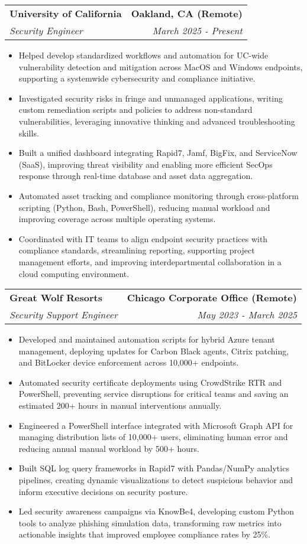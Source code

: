\documentclass[letterpaper,10pt]{article}
\makeatletter
\newcommand{\resumeItem}[1]{\item\small{#1}}
\newcommand{\resumeItemListStart}{\begin{itemize}}
\newcommand{\resumeItemListEnd}{\end{itemize}\vspace{-2pt}}
\newcommand{\resumeSubheading}[4]{%
  \vspace{-2pt}\item
  \begin{tabular*}{\textwidth}[t]{l@{\extracolsep{\fill}}r}
    \textbf{\large #1} & \textbf{\small #2} \\
    \textit{\large #3} & \textit{\small #4} \\
  \end{tabular*}\vspace{-2pt}
}
\makeatother
\begin{document}
\resumeSubheading
  {University of California}{Oakland, CA (Remote)}
  {Security Engineer}{March 2025 - Present}
  \vspace{2pt}
\resumeItemListStart
  \resumeItem{Helped develop standardized workflows and automation for UC-wide vulnerability detection and mitigation across MacOS and Windows endpoints, supporting a systemwide cybersecurity and compliance initiative.}
  \resumeItem{Investigated security risks in fringe and unmanaged applications, writing custom remediation scripts and policies to address non-standard vulnerabilities, leveraging innovative thinking and advanced troubleshooting skills.}
  \resumeItem{Built a unified dashboard integrating Rapid7, Jamf, BigFix, and ServiceNow (SaaS), improving threat visibility and enabling more efficient SecOps response through real-time database and asset data aggregation.}
  \resumeItem{Automated asset tracking and compliance monitoring through cross-platform scripting (Python, Bash, PowerShell), reducing manual workload and improving coverage across multiple operating systems.}
  \resumeItem{Coordinated with IT teams to align endpoint security practices with compliance standards, streamlining reporting, supporting project management efforts, and improving interdepartmental collaboration in a cloud computing environment.}
\resumeItemListEnd
\vspace{6pt}

\resumeSubheading
  {Great Wolf Resorts}{Chicago Corporate Office (Remote)}
  {Security Support Engineer}{May 2023 - March 2025}
\vspace{2pt}
\resumeItemListStart
  \resumeItem{Developed and maintained automation scripts for hybrid Azure tenant management, deploying updates for Carbon Black agents, Citrix patching, and BitLocker device enforcement across 10,000+ endpoints.}
  \resumeItem{Automated security certificate deployments using CrowdStrike RTR and PowerShell, preventing service disruptions for critical teams and saving an estimated 200+ hours in manual interventions annually.}
  \resumeItem{Engineered a PowerShell interface integrated with Microsoft Graph API for managing distribution lists of 10,000+ users, eliminating human error and reducing annual manual workload by 500+ hours.}
  \resumeItem{Built SQL log query frameworks in Rapid7 with Pandas/NumPy analytics pipelines, creating dynamic visualizations to detect suspicious behavior and inform executive decisions on security posture.}
  \resumeItem{Led security awareness campaigns via KnowBe4, developing custom Python tools to analyze phishing simulation data, transforming raw metrics into actionable insights that improved employee compliance rates by 25\%.}
\resumeItemListEnd
\vspace{6pt}
\end{document}
